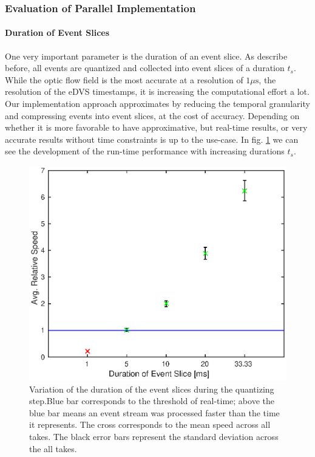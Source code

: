 
\subsubsection{Evaluation of Parallel Implementation}
\paragraph{Duration of Event Slices}
One very important parameter is the duration of an event slice. As describe before, all events are quantized and collected into event slices of a duration $t_s$.
While the optic flow field is the most accurate at a resolution of $1\mu\mathrm{s}$, the resolution of the eDVS timestamps, it is increasing the computational effort a lot.
Our implementation approach approximates by reducing the temporal granularity and compressing events into event slices, at the cost of accuracy.
Depending on whether it is more favorable to have approximative, but real-time results, or very accurate results without time constraints is up to the use-case.
In fig. \ref{fig:gpu_tsd} we can see the development of the run-time performance with increasing durations $t_s$.
\begin{figure}[!htb]
	\centering
	\includegraphics[scale=.9]{gpu_tsd.eps}
	\caption{Variation of the duration of the event slices during the quantizing step.Blue bar corresponds to the threshold of real-time; above the blue bar means an event stream was processed faster than the time it represents. The cross corresponds to the mean speed across all takes. The black error bars represent the standard deviation across the all takes.}
	\label{fig:gpu_tsd}
\end{figure}
